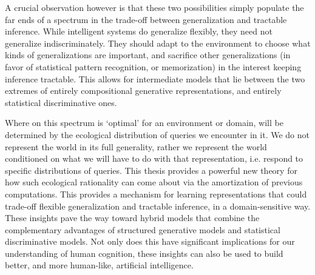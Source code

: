 A crucial observation however is that these two possibilities simply populate the far ends of a spectrum in the trade-off between generalization and tractable inference. While intelligent systems do generalize flexibly, they need not generalize indiscriminately. They should adapt to the environment to choose what kinds of generalizations are important, and sacrifice other generalizations (in favor of statistical pattern recognition, or memorization) in the interest keeping inference tractable. This allows for intermediate models that lie between the two extremes of entirely compositional generative representations, and entirely statistical discriminative ones. 

Where on this spectrum is `optimal' for an environment or domain, will be determined by the ecological distribution of queries we encounter in it. We do not represent the world in its full generality, rather we represent the world conditioned on what we will have to do with that representation, i.e. respond to specific distributions of queries. This thesis provides a powerful new theory for how such ecological rationality can come about via the amortization of previous computations. This provides a mechanism for learning representations that could trade-off flexible generalization and tractable inference, in a domain-sensitive way. These insights pave the way toward hybrid models that combine the complementary advantages of structured generative models and statistical discriminative models. Not only does this have significant implications for our understanding of human cognition, these insights can also be used to build better, and more human-like, artificial intelligence.







